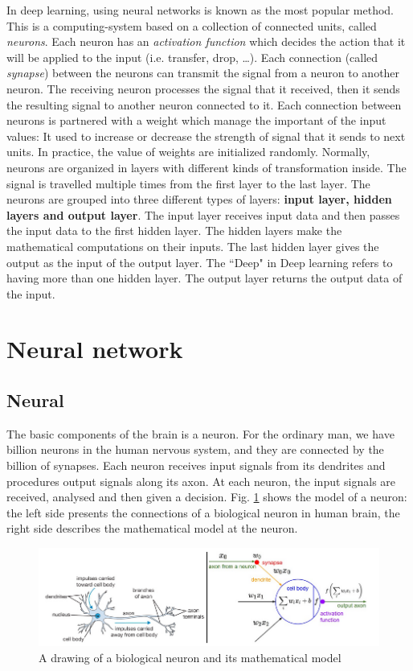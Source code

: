 In deep learning, using neural networks is known as the most popular method. This is a computing-system based on a collection of connected units, called \textit{neurons}. Each neuron has an \textit{activation function} which decides the action that it will be applied to the input (i.e. transfer, drop, \ldots). Each connection (called \textit{synapse}) between the neurons can transmit the signal from a neuron to another neuron. The receiving neuron processes the signal that it received, then it sends the resulting signal to another neuron connected to it. Each connection between neurons is partnered with a weight which manage the important of the input values: It used to increase or decrease the strength of signal that it sends to next units. In practice, the value of weights are initialized randomly. Normally, neurons are organized in layers with different kinds of transformation inside. The signal is travelled multiple times from the first layer to the last layer. The neurons are grouped into three different types of layers: \textbf{input layer, hidden layers and output layer}. The input layer receives input data and then passes the input data to the first hidden layer. The hidden layers make the mathematical computations on their inputs. The last hidden layer gives the output as the input of the output layer. The ``Deep" in Deep learning refers to having more than one hidden layer. The output layer returns the output data of the input.

 

\section{Neural network}
\subsection{Neural}
The basic components of the brain is a neuron. For the ordinary man, we have billion neurons in the human nervous system, and they are connected by the billion of synapses. Each neuron receives input signals from its dendrites and procedures output signals along its axon. At each neuron, the input signals are received, analysed and then given a decision. Fig. \ref{fignneuron} shows the model of a neuron: the left side presents the connections of a biological neuron in human brain, the right side describes the mathematical model at the neuron.

\begin{figure}[h]
	\centering
	\includegraphics[scale=0.5]{images/neurons.png}
	\caption{A drawing of a biological neuron and its mathematical model}
	\label{fignneuron}
\end{figure}

